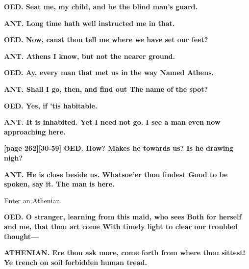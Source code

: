 \documentclass[11pt,letter]{book}
\begin{document}
\par \textbf{OED. Seat me, my child, and be the blind man’s guard.}
\par 

\par \textbf{ANT. Long time hath well instructed me in that.}
\par 

\par \textbf{OED. Now, canst thou tell me where we have set our feet?}
\par 

\par \textbf{ANT. Athens I know, but not the nearer ground.}
\par 

\par \textbf{OED. Ay, every man that met us in the way Named Athens.}
\par 

\par \textbf{ANT. Shall I go, then, and find out The name of the spot?}
\par 

\par \textbf{OED. Yes, if ’tis habitable.}
\par 

\par \textbf{ANT. It is inhabited. Yet I need not go. I see a man even now approaching here.}
\par 

\par \textbf{[page 262][30-59] OED. How? Makes he towards us? Is he drawing nigh?}
\par 

\par \textbf{ANT. He is close beside us. Whatsoe’er thou findest Good to be spoken, say it. The man is here.}
\par 

\par  Enter an Athenian.

\par \textbf{OED. O stranger, learning from this maid, who sees Both for herself and me, that thou art come With timely light to clear our troubled thought—}
\par 

\par \textbf{ATHENIAN. Ere thou ask more, come forth from where thou sittest! Ye trench on soil forbidden human tread.}
\par 
\end{document}

